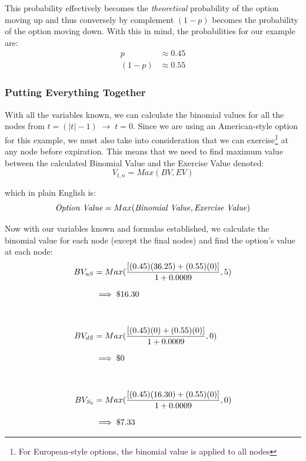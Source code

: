 \documentclass[12pt, letterpaper]{article}\usepackage{float}
\begin{document}
\medskip

This probability effectively becomes the \textit{theoretical} probability of the option moving up and thus conversely by complement ${(1-p)}$ becomes the probability of the option moving down. With this in mind, the probabilities for our example are:
\begin{align*}
  p
  & \approx 0.45 \\
  (1-p)
  & \approx 0.55
\end{align*}

\pagebreak
\subsubsection*{Putting Everything Together}
With all the variables known, we can calculate the binomial values for all the nodes from ${t=(\vert t \vert - 1) \; \rightarrow \; t=0}$.
Since we are using an American-style option for this example, we must also take into consideration that we can exercise\footnote{For European-style options, the binomial value is applied to all nodes\cite{bopmwikipedia}} at any node before expiration.
This means that we need to find maximum value between the calculated Binomial Value and the Exercise Value denoted\cite{bopmwikipedia}:
\begin{equation*}
  V_{t,n} = Max({BV, EV})
\end{equation*}

\noindent which in plain English is:
\begin{equation*}
  \textrm{\textit{Option Value}} = Max(\textrm{\textit{Binomial Value}}, \textrm{\textit{Exercise Value}})
\end{equation*}

\bigskip

Now with our variables known and formulas established, we calculate the binomial value for each node (except the final nodes) and find the option's value at each node:
\begin{equation*}
  \setlength{\jot}{10pt}
  \begin{split}
    BV_{uS}
    & = Max(\frac{[(0.45)(36.25) + (0.55)(0)]}{1+0.0009}, 5) \\
    & \implies \$16.30 \\
    \\
    BV_{dS}
    & = Max(\frac{[(0.45)(0) + (0.55)(0)]}{1+0.0009}, 0) \\
    & \implies \$0 \\
    \\
    BV_{S_0}
    & = Max(\frac{[(0.45)(16.30) + (0.55)(0)]}{1+0.0009}, 0) \\
    & \implies \$7.33
  \end{split}
\end{equation*}
\end{document}
